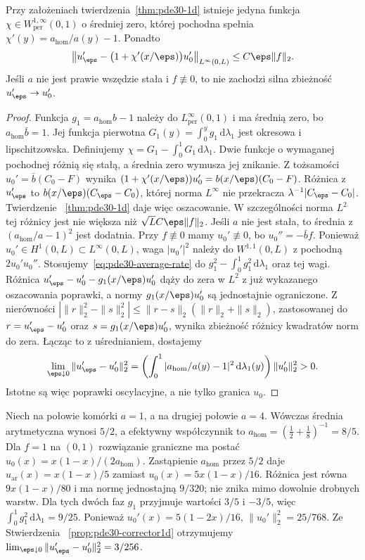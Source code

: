 \begin{stwierdzenie}\label{prop:pde30-corrector1d}
Przy założeniach twierdzenia~\ref{thm:pde30-1d} istnieje jedyna
funkcja $\chi\in W^{1,\infty}_{\mathrm{per}}(0,1)$ o średniej zero,
której pochodna spełnia $\chi'(y)=a_{\mathrm{hom}}/a(y)-1$.
Ponadto
\[
\left\|u_\eps'-\bigl(1+\chi'(x/\eps)\bigr)u_0'\right\|_{L^\infty(0,L)}
\le C\eps\|f\|_2.
\]
Jeśli $a$ nie jest prawie wszędzie stała i $f\not\equiv0$,
to nie zachodzi silna zbieżność $u_\eps'\to u_0'$.
\end{stwierdzenie}
\begin{proof}
Funkcja $g_1=a_{\mathrm{hom}}b-1$ należy do
$L^\infty_{\mathrm{per}}(0,1)$ i ma średnią zero,
bo $a_{\mathrm{hom}}\bar b=1$.
Jej funkcja pierwotna $G_1(y)=\int_0^y g_1\,\mathrm d\lambda_1$
jest okresowa i lipschitzowska. Definiujemy
$\chi=G_1-\int_0^1G_1\,\mathrm d\lambda_1$.
Dwie funkcje o wymaganej pochodnej różnią się stałą,
a średnia zero wymusza jej znikanie.
Z tożsamości $u_0'=\bar b(C_0-F)$ wynika
$(1+\chi'(x/\eps))u_0'=b(x/\eps)(C_0-F)$.
Różnica z $u_\eps'$ to $b(x/\eps)(C_\eps-C_0)$,
której norma $L^\infty$ nie przekracza
$\lambda^{-1}|C_\eps-C_0|$. Twierdzenie
~\ref{thm:pde30-1d} daje więc oszacowanie.
W szczególności norma $L^2$ tej różnicy jest
nie większa niż $\sqrt L C\eps\|f\|_2$.
Jeśli $a$ nie jest stała, to średnia z
$(a_{\mathrm{hom}}/a-1)^2$ jest dodatnia.
Przy $f\not\equiv0$ mamy $u_0'\not\equiv0$,
bo $u_0''=-\bar b f$.
Ponieważ $u_0'\in H^1(0,L)\subset L^\infty(0,L)$,
waga $|u_0'|^2$ należy do $W^{1,1}(0,L)$
z pochodną $2u_0'u_0''$.
Stosujemy~\eqref{eq:pde30-average-rate} do
$g_1^2-\int_0^1g_1^2\,\mathrm d\lambda_1$
oraz tej wagi. Różnica
$u_\eps'-u_0'-g_1(x/\eps)u_0'$ dąży do zera w $L^2$
z już wykazanego oszacowania poprawki,
a normy $g_1(x/\eps)u_0'$ są jednostajnie ograniczone.
Z nierówności
$|\|r\|_2^2-\|s\|_2^2|\le\|r-s\|_2(\|r\|_2+\|s\|_2)$,
zastosowanej do $r=u_\eps'-u_0'$ oraz
$s=g_1(x/\eps)u_0'$, wynika zbieżność różnicy
kwadratów norm do zera. Łącząc to z uśrednianiem, dostajemy
\[
\lim_{\eps\downarrow0}\|u_\eps'-u_0'\|_2^2=
\left(\int_0^1|a_{\mathrm{hom}}/a(y)-1|^2
\,\mathrm d\lambda_1(y)\right)\|u_0'\|_2^2>0.
\]
Istotne są więc poprawki oscylacyjne, a nie tylko granica $u_0$.
\end{proof}

\begin{przyklad}
Niech na połowie komórki $a=1$, a na drugiej połowie $a=4$.
Wówczas średnia arytmetyczna wynosi $5/2$, a efektywny
współczynnik to $a_{\mathrm{hom}}=(\tfrac12+\tfrac18)^{-1}=8/5$.
Dla $f=1$ na $(0,1)$ rozwiązanie graniczne ma postać
$u_0(x)=x(1-x)/(2a_{\mathrm{hom}})$.
Zastąpienie $a_{\mathrm{hom}}$ przez $5/2$ daje
$u_{\mathrm{ar}}(x)=x(1-x)/5$ zamiast
$u_0(x)=5x(1-x)/16$. Różnica jest równa
$9x(1-x)/80$ i ma normę jednostajną $9/320$;
nie znika mimo dowolnie drobnych warstw.
Dla tych dwóch faz $g_1$ przyjmuje wartości
$3/5$ i $-3/5$, więc
$\int_0^1g_1^2\,\mathrm d\lambda_1=9/25$.
Ponieważ $u_0'(x)=5(1-2x)/16$,
$\|u_0'\|_2^2=25/768$. Ze Stwierdzenia
~\ref{prop:pde30-corrector1d} otrzymujemy
$\lim_{\eps\downarrow0}\|u_\eps'-u_0'\|_2^2=3/256$.
\end{przyklad}

